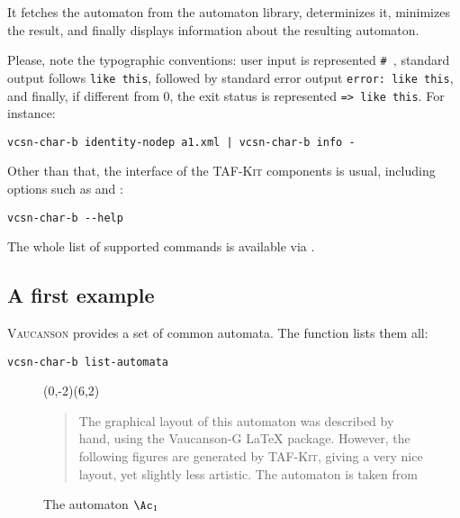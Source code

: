 \documentclass[a4paper]{report}
\newcommand{\Index}[1]{\index{#1}#1}
\newenvironment{legend}{%
  \begin{quote}%
    }{%
  \end{quote}%
}
\newcommand{\taffn}[1]{\code{#1}}
\newcommand{\tafkit}{\textsc{TAF-Kit}\xspace}
\newcommand{\Vauc}{\textsc{Vaucanson}\xspace}
\begin{document}
\noindent
It fetches the automaton  from the automaton library,
determinizes it, minimizes the result, and finally displays
information about the resulting automaton.

Please, note the typographic conventions: user input is represented
\texttt{\# }, standard output follows \texttt{like
  this}, followed by standard error output \texttt{error: like this},
and finally, if different from 0, the exit status is represented
\texttt{=> like this}.  For instance:

\begin{verbatim}
vcsn-char-b identity-nodep a1.xml | vcsn-char-b info -
\end{verbatim}

\smallskip

Other than that, the interface of the \tafkit components is usual,
including options such as  and :

\begin{verbatim}
vcsn-char-b --help
\end{verbatim}

The whole list of supported commands is available via
.

\subsection{A first example}

\Vauc provides a set of common automata.  The function
\Index{\taffn{list-automata}} lists them all:

\begin{verbatim}
vcsn-char-b list-automata
\end{verbatim}

\begin{figure}[ht] \centering
  \begin{VCPicture}{(0,-2)(6,2)}
  \end{VCPicture}
  \begin{legend}
    The graphical layout of this automaton was described by hand,
    using the Vaucanson-G \LaTeX{} package.  However, the following
    figures are generated by \tafkit, giving a very nice layout, yet
    slightly less artistic.
    The automaton is taken from \citet[Fig. I.1.1, p. 58]{sakarovitch.03.eta.}
  \end{legend}
  \caption{The automaton $\Ac_1$}
  \label{fig:a1}
\end{figure}
\end{document}
